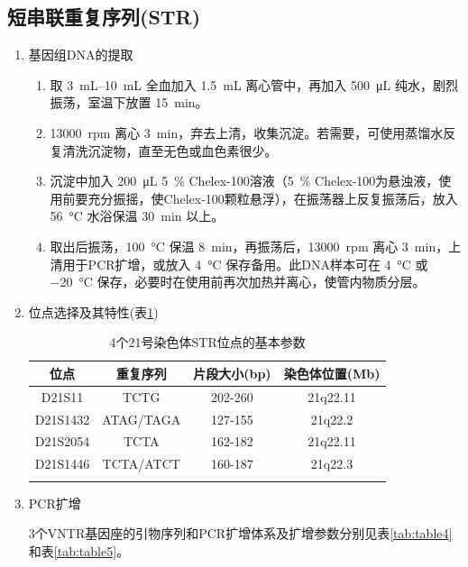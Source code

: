 \documentclass[AutoFakeBold]{LZUThesis}
\begin{document}
\subsection{短串联重复序列(STR)}
\begin{enumerate}
    \item 基因组DNA的提取
    \begin{enumerate}
        \item 取 \SIrange{3}{10}{\milli\liter} 全血加入 \SI{1.5}{\milli\liter} 离心管中，再加入 \SI{500}{\micro\liter} 纯水，剧烈振荡，室温下放置 \SI{15}{\minute}。
        \item \SI{13000}{rpm} 离心 \SI{3}{\minute}，弃去上清，收集沉淀。若需要，可使用蒸馏水反复清洗沉淀物，直至无色或血色素很少。
        \item 沉淀中加入 \SI{200}{\micro\liter} \SI{5}{\percent} Chelex-100溶液（\SI{5}{\percent} Chelex-100为悬浊液，使用前要充分振摇，使Chelex-100颗粒悬浮），在振荡器上反复振荡后，放入 \SI{56}{\degreeCelsius} 水浴保温 \SI{30}{\minute} 以上。
        \item 取出后振荡，\SI{100}{\degreeCelsius} 保温 \SI{8}{\minute}，再振荡后，\SI{13000}{rpm} 离心 \SI{3}{\minute}，上清用于PCR扩增，或放入 \SI{4}{\degreeCelsius} 保存备用。此DNA样本可在 \SI{4}{\degreeCelsius} 或 \SI{-20}{\degreeCelsius} 保存，必要时在使用前再次加热并离心，使管内物质分层。
    \end{enumerate}
    \item 位点选择及其特性(表\ref{tab:table3})\par
    \begin{longtable}{cccc}
        位点 & 重复序列 & 片段大小(bp) & 染色体位置(Mb) \\
        \midrule
        D21S11 & TCTG & 202-260 & 21q22.11 \\
        D21S1432 & ATAG/TAGA & 127-155 & 21q22.2 \\
        D21S2054 & TCTA & 162-182 & 21q22.11 \\
        D21S1446 & TCTA/ATCT & 160-187 & 21q22.3 \\
        \bottomrule
        \caption{4个21号染色体STR位点的基本参数}
        \label{tab:table3} \\
    \end{longtable}
    \item PCR扩增\par
    3个VNTR基因座的引物序列和PCR扩增体系及扩增参数分别见表\ref{tab:table4}和表\ref{tab:table5}。\par
    \begin{longtable}{c|p{4.7cm}cccc}

\end{longtable}
\end{enumerate}
\end{document}
